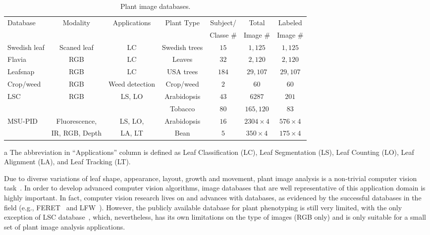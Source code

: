 \begin{table}[t!]
	\centering
	  \begin{threeparttable}
	\caption{Plant image databases.}
	\begin{tabular}{l|c|c|c|c|c|c}
		\hline
		\multirow{2}{*}{Database}&  \multirow{2}{*}{Modality}  &  \multirow{2}{*}{Applications}\tnote{a} & \multirow{2}{*}{Plant Type} & Subject/ &Total  &  Labeled   \\ 						
			&         &  &                    &       Classe \#         &  Image \#    & Image \# \\ \hline
		
Swedish leaf &  Scaned leaf & LC& Swedish trees & $15$ & $1,125$ & $1,125$ \\ \hline
Flavia& RGB  & LC& Leaves & $32$  & $2,120$ & $2,120$ \\ \hline
Leafsnap  & RGB & LC& USA trees & $184$ & $29,107$  &  $29,107$ \\ \hline
Crop/weed &  RGB &Weed detection & Crop/weed & $2$  & $60$ & $60$ \\ \hline
\multirow{2}{*}{LSC} & \multirow{2}{*}{RGB}  & \multirow{2}{*}{LS, LO} & Arabidopsis &  $43$ & $6287$ & $201$ \\ \cline{4-7}
							    &  & & Tobacco & $80$ & $165,120$ & $83$ \\ \hline
\multirow{2}{*}{MSU-PID}  & Fluorescence,  & LS, LO, & Arabidopsis &  $16$ &  $2304\times 4$ & $576\times 4$     \\ \cline{4-7}
							    & IR, RGB, Depth & LA, LT & Bean & $5$ & $350\times 4$  &  $175\times 4$ \\ \hline
	       \hline
	\end{tabular}
\begin{tablenotes}
	    \footnotesize	
            \item[a] The abbreviation in ``Applications'' column is defined as Leaf Classification (LC), Leaf Segmentation (LS), Leaf Counting (LO), Leaf Alignment (LA), and Leaf Tracking (LT).
        \end{tablenotes}
     \end{threeparttable}
	\label{tab:database}
\end{table}

Due to diverse variations of leaf shape, appearance, layout, growth and movement, plant image analysis is a non-trivial computer vision task~\cite{Minervini2015}.
In order to develop advanced computer vision algorithms, image databases that are well representative of this application domain is highly important.
In fact, computer vision research lives on and advances with databases, as evidenced by the successful databases in the field (e.g., FERET~\cite{Phillips2000} and LFW~\cite{LFW}).
However, the publicly available database for plant phenotyping is still very limited, with the only exception of LSC database~\cite{scharr2014annotated}, which, nevertheless, has its own limitations on the type of images (RGB only) and is only suitable for a small set of plant image analysis applications.



